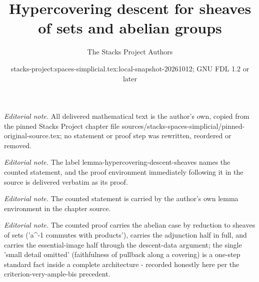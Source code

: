 \documentclass{stacks-project}
\title{Hypercovering descent for sheaves of sets and abelian groups}
\author{The Stacks Project Authors}
\date{stacks-project:spaces-simplicial.tex:local-snapshot-20261012; GNU FDL 1.2 or later}
\theoremstyle{plain}
\theoremstyle{definition}
\theoremstyle{remark}
\numberwithin{equation}{subsection}
\begin{document}
\maketitle
\noindent\textit{Editorial note.} All delivered mathematical text is the author's own, copied from the pinned Stacks Project chapter file sources/stacks-spaces-simplicial/pinned-original-source.tex; no statement or proof step was rewritten, reordered or removed.\par\medskip
\noindent\textit{Editorial note.} The label lemma-hypercovering-descent-sheaves names the counted statement, and the proof environment immediately following it in the source is delivered verbatim as its proof.\par\medskip
\noindent\textit{Editorial note.} The counted statement is carried by the author's own lemma environment in the chapter source.\par\medskip
\noindent\textit{Editorial note.} The counted proof carries the abelian case by reduction to sheaves of sets ('a\textasciicircum{}-1 commutes with products'), carries the adjunction half in full, and carries the essential-image half through the descent-data argument; the single 'small detail omitted' (faithfulness of pullback along a covering) is a one-step standard fact inside a complete architecture - recorded honestly here per the criterion-very-ample-bis precedent.\par\medskip
\end{document}
